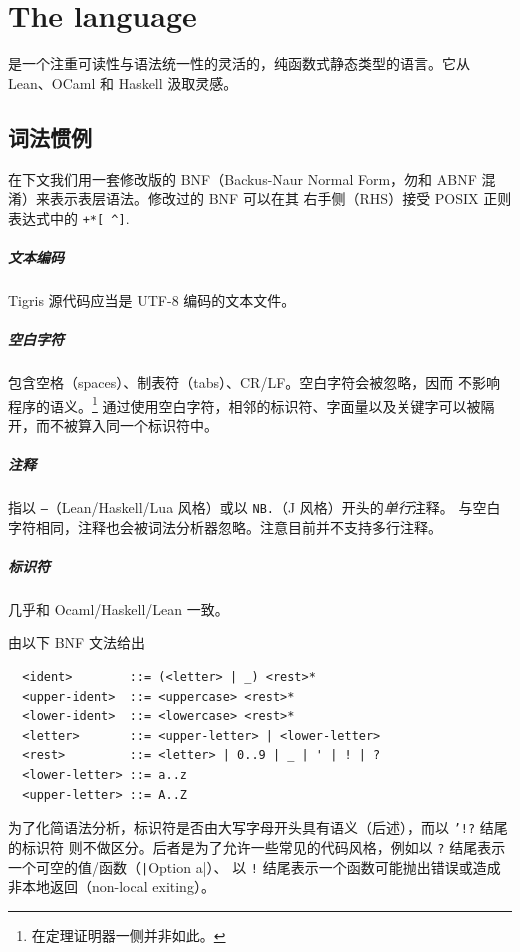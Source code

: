 \chapter{The \Tigris language}
\Tigris 是一个注重可读性与语法统一性的灵活的，纯函数式静态类型的语言。它从 Lean、OCaml 和 Haskell 汲取灵感。

\section{词法惯例}
在下文我们用一套修改版的 BNF（Backus-Naur Normal Form，勿和 ABNF 混淆）来表示表层语法。修改过的 BNF 可以在其
右手侧（RHS）接受 POSIX 正则表达式中的 \texttt{+*[\,\^\;]}.
{\setlength{\parskip}{-1em}
  \paragraph*{文本编码} Tigris 源代码应当是 UTF-8 编码的文本文件。
  \paragraph*{空白字符} 包含空格（spaces）、制表符（tabs）、CR/LF。空白字符会被忽略，因而
  不影响程序的语义。\footnote{在定理证明器一侧并非如此。}
  通过使用空白字符，相邻的标识符、字面量以及关键字可以被隔开，而不被算入同一个标识符中。
  \paragraph*{注释} 指以 \texttt{--}（Lean/Haskell/Lua 风格）或以 \texttt{NB.}（J 风格）开头的\emph{单行}注释。
  与空白字符相同，注释也会被词法分析器忽略。注意目前并不支持多行注释。
}
\paragraph*{标识符} 几乎和 Ocaml/Haskell/Lean 一致。
\begin{definition}[标识符]\label{def:ident} 由以下 BNF 文法给出
  \begin{verbatim}
  <ident>        ::= (<letter> | _) <rest>*
  <upper-ident>  ::= <uppercase> <rest>*
  <lower-ident>  ::= <lowercase> <rest>*
  <letter>       ::= <upper-letter> | <lower-letter>
  <rest>         ::= <letter> | 0..9 | _ | ' | ! | ?
  <lower-letter> ::= a..z
  <upper-letter> ::= A..Z
  \end{verbatim}
\end{definition}

为了化简语法分析，标识符是否由大写字母开头具有语义（后述），而以 \texttt{'!?} 结尾的标识符
则不做区分。后者是为了允许一些常见的代码风格，例如以 \texttt{?} 结尾表示一个可空的值/函数（\texttt|Option a|）、
以 \texttt{!} 结尾表示一个函数可能抛出错误或造成非本地返回（non-local exiting）。

